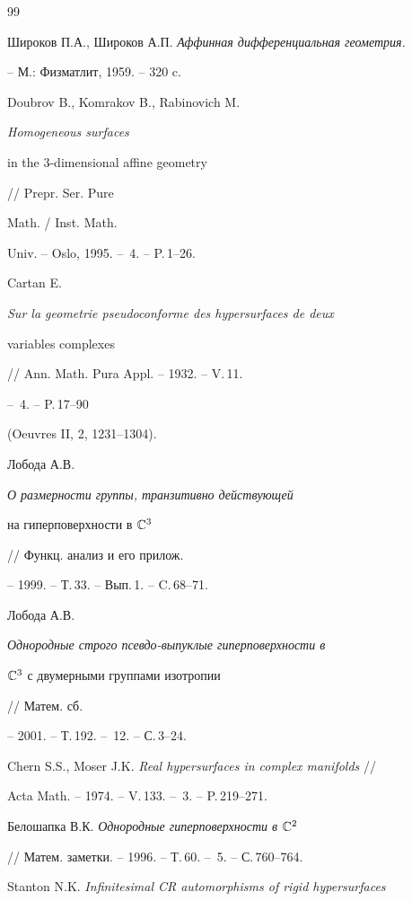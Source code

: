 \begin{thebibliography}{99}







Широков П.А., Широков А.П. {\em Аффинная дифференциальная геометрия}.


-- М.: Физ\-мат\-лит, 1959. -- 320 c.




Doubrov B., Komrakov B., Rabinovich M. {\em Homogeneous surfaces 


in the $3$-dimensional affine geometry} // Prepr. Ser. Pure


Math. / Inst. Math.


Univ. -- Oslo, 1995. -- \No\,4. -- P.\,1--26. 




Cartan E. {\em Sur la geometrie pseudoconforme des hypersurfaces de deux 


variables complexes} // Ann. Math. Pura Appl. -- 1932. -- V.\,11.


-- \No\,4. -- P.\,17--90


(Oeuvres II, 2, 1231--1304).




Лобода А.В. {\em О размерности группы, транзитивно действующей 


на гиперповерхности в $ \Bbb C^3 $} // Функц. анализ и его прилож. 


-- 1999. -- Т.\,33. -- Вып.\,1. -- C.\,68--71.




Лобода А.В. {\em Однородные строго псевдо-выпуклые гиперповерхности в 


 $ \Bbb C^3 $ с двумерными группами изотропии} // Матем. сб.


-- 2001. -- Т.\,192. -- \No\,12. -- С.\,3--24. 




Chern S.S., Moser J.K. {\em Real hypersurfaces in complex manifolds} //


Acta Math. -- 1974. -- V.\,133. -- \No\,3. -- P.\,219--271.




Белошапка В.К. {\em Однородные гиперповерхности в $ \Bbb C^2 $} 


// Матем. заметки. -- 1996. -- Т.\,60. -- \No\,5. -- С.\,760--764. 




Stanton N.K. {\em Infinitesimal CR automorphisms of rigid hypersurfaces} 



\end{thebibliography}
